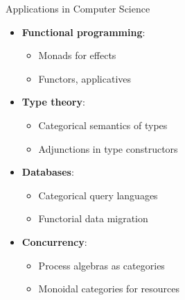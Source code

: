 \documentclass{beamer}
\begin{document}
    \begin{frame}{Applications in Computer Science}
    \begin{itemize}
        \item \textbf{Functional programming}:
            \begin{itemize}
                \item Monads for effects
                \item Functors, applicatives
            \end{itemize}
        \item \textbf{Type theory}:
            \begin{itemize}
                \item Categorical semantics of types
                \item Adjunctions in type constructors
            \end{itemize}
        \item \textbf{Databases}:
            \begin{itemize}
                \item Categorical query languages
                \item Functorial data migration
            \end{itemize}
        \item \textbf{Concurrency}:
            \begin{itemize}
                \item Process algebras as categories
                \item Monoidal categories for resources
            \end{itemize}
    \end{itemize}
    \end{frame}
    
\end{document}
